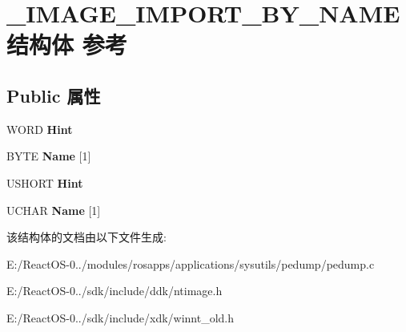 \hypertarget{struct___i_m_a_g_e___i_m_p_o_r_t___b_y___n_a_m_e}{}\section{\+\_\+\+I\+M\+A\+G\+E\+\_\+\+I\+M\+P\+O\+R\+T\+\_\+\+B\+Y\+\_\+\+N\+A\+M\+E结构体 参考}
\label{struct___i_m_a_g_e___i_m_p_o_r_t___b_y___n_a_m_e}
\subsection*{Public 属性}
\begin{DoxyCompactItemize}
\item 
\mbox{\label{struct___i_m_a_g_e___i_m_p_o_r_t___b_y___n_a_m_e_a9f1eb05cfca0bf58421d97c6e579260e}} 
W\+O\+RD {\bfseries Hint}
\item 
\mbox{\label{struct___i_m_a_g_e___i_m_p_o_r_t___b_y___n_a_m_e_a557e273b3ebb08803e6837d2d8985e4f}} 
B\+Y\+TE {\bfseries Name} \mbox{[}1\mbox{]}
\item 
\mbox{\label{struct___i_m_a_g_e___i_m_p_o_r_t___b_y___n_a_m_e_af2dc8393142efc1b37dc609d27bfdd50}} 
U\+S\+H\+O\+RT {\bfseries Hint}
\item 
\mbox{\label{struct___i_m_a_g_e___i_m_p_o_r_t___b_y___n_a_m_e_ac40516c0c4200b33e4a3c7e99a99ad68}} 
U\+C\+H\+AR {\bfseries Name} \mbox{[}1\mbox{]}
\end{DoxyCompactItemize}


该结构体的文档由以下文件生成\+:\begin{DoxyCompactItemize}
\item 
E\+:/\+React\+O\+S-\/0../modules/rosapps/applications/sysutils/pedump/pedump.\+c\item 
E\+:/\+React\+O\+S-\/0../sdk/include/ddk/ntimage.\+h\item 
E\+:/\+React\+O\+S-\/0../sdk/include/xdk/winnt\+\_\+old.\+h\end{DoxyCompactItemize}
